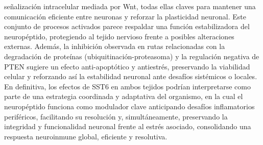 \documentclass[10pt,a4paper]{article}
\begin{document}
señalización intracelular mediada por Wnt, todas ellas claves para mantener una comunicación eficiente entre neuronas y reforzar la plasticidad neuronal. Este conjunto de procesos activados parece respaldar una función estabilizadora del neuropéptido, protegiendo al tejido nervioso frente a posibles alteraciones externas. Además, la inhibición observada en rutas relacionadas con la degradación de proteínas (ubiquitinación-proteasoma) y la regulación negativa de PTEN sugiere un efecto anti-apoptótico y antiestrés, preservando la viabilidad celular y reforzando así la estabilidad neuronal ante desafíos sistémicos o locales. En definitiva, los efectos de SST6 en ambos tejidos podrían interpretarse como parte de una estrategia coordinada y adaptativa del organismo, en la cual el neuropéptido funciona como modulador clave anticipando desafíos inflamatorios periféricos, facilitando su resolución y, simultáneamente, preservando la integridad y funcionalidad neuronal frente al estrés asociado, consolidando una respuesta neuroinmune global, eficiente y resolutiva.
\end{document}
